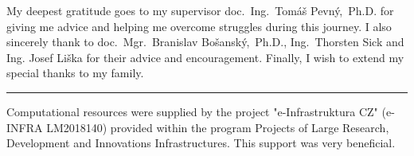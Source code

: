 \documentclass[11pt,twoside,a4paper]{book}
\begin{document}
	\translate

	{
		
		\newpage
	}

	\coverpagestarts

	\acknowledgements
	\noindent
	My deepest gratitude goes to my supervisor doc.~Ing.~Tomáš Pevný,~Ph.D. for giving me advice and helping me overcome struggles during this journey. I also sincerely thank to doc.~Mgr.~Branislav Bošanský,~Ph.D., Ing.~Thorsten Sick and Ing. Josef Liška for their advice and encouragement. Finally, I wish to extend my special thanks to my family.

	\noindent\rule{\textwidth}{0.4pt}

	\noindent Computational resources were supplied by the project "e-Infrastruktura CZ" (e-INFRA LM2018140) provided within the program Projects of Large Research, Development and Innovations Infrastructures. This support was very beneficial.


\end{document}
